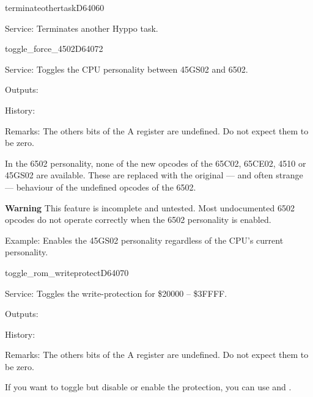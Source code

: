 \begin{hyppotrap}{terminateothertask}{D640}{60}
\item [Service:]
  Terminates another Hyppo task.
\notimplemented
\end{hyppotrap}


\newpage
\begin{hyppotrap}{toggle\_force\_4502}{D640}{72}
\item [Service:]
  Toggles the CPU personality between 45GS02 and 6502.
\item [Outputs:]
\item [History:]
\item [Remarks:]
  The others bits of the A register are undefined. Do not expect them to be
  zero.

  In the 6502 personality, none of the new opcodes of the 65C02, 65CE02, 4510
  or 45GS02 are available. These are replaced with the original --- and often
  strange --- behaviour of the undefined opcodes of the 6502.

  \textbf{Warning} This feature is incomplete and untested. Most undocumented
  6502 opcodes do not operate correctly when the 6502 personality is enabled.
\item [Example:] Enables the 45GS02 personality regardless of the CPU's current
  personality.
\end{hyppotrap}


\newpage
\begin{hyppotrap}{toggle\_rom\_writeprotect}{D640}{70}
\item [Service:]
  Toggles the write-protection for \$20000 -- \$3FFFF.
\item [Outputs:]
\item [History:]
\item [Remarks:]
  The others bits of the A register are undefined. Do not expect them to be
  zero.

  If you want to toggle but disable or enable the protection, you can use
   and .
\end{hyppotrap}


